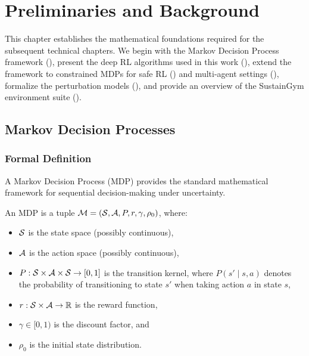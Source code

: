 \chapter{Preliminaries and Background}
\label{ch:preliminaries}

This chapter establishes the mathematical foundations required for the subsequent technical chapters. We begin with the Markov Decision Process framework (), present the deep RL algorithms used in this work (), extend the framework to constrained MDPs for safe RL () and multi-agent settings (), formalize the perturbation models (), and provide an overview of the SustainGym environment suite ().

\section{Markov Decision Processes}
\label{sec:mdp}

\subsection{Formal Definition}

A Markov Decision Process (MDP) provides the standard mathematical framework for sequential decision-making under uncertainty.

\begin{definition}
\label{def:mdp}
An MDP is a tuple $\mathcal{M} = (\mathcal{S}, \mathcal{A}, P, r, \gamma, \rho_0)$, where:
\begin{itemize}
    \item $\mathcal{S}$ is the state space (possibly continuous),
    \item $\mathcal{A}$ is the action space (possibly continuous),
    \item $P: \mathcal{S} \times \mathcal{A} \times \mathcal{S} \to [0, 1]$ is the transition kernel, where $P(s' \mid s, a)$ denotes the probability of transitioning to state $s'$ when taking action $a$ in state $s$,
    \item $r: \mathcal{S} \times \mathcal{A} \to \mathbb{R}$ is the reward function,
    \item $\gamma \in [0, 1)$ is the discount factor, and
    \item $\rho_0$ is the initial state distribution.
\end{itemize}
\end{definition}

